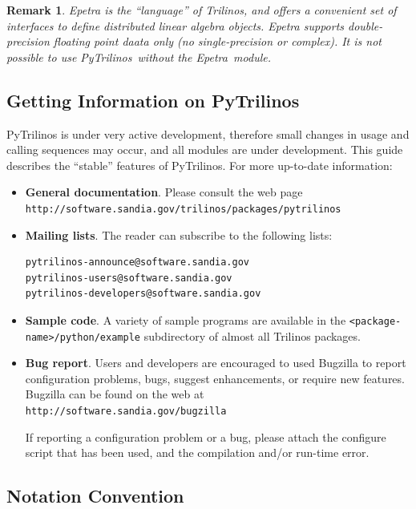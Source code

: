 \documentclass[10pt,relax]{SANDreport}
\newcommand{\PyTrilinos}{{PyTrilinos}}
\newcommand{\epetra}{{Epetra}}
\newtheorem{remark}{Remark}
\begin{document}
\begin{remark}
Epetra is the
``language'' of Trilinos, and offers a convenient set of interfaces to define
distributed linear algebra objects. Epetra supports double-precision floating
point daata only (no single-precision or complex). 
It is not possible to use \PyTrilinos\ without the \epetra\ module.
\end{remark}

\subsection{Getting Information on \PyTrilinos}

PyTrilinos is under very active development, therefore small changes in usage
and calling sequences may occur, and all modules are under development. This
guide describes the ``stable'' features of PyTrilinos. For more up-to-date
information:
\begin{itemize}
\item {\bf General documentation}.
Please consult the web page \\
  \verb!http://software.sandia.gov/trilinos/packages/pytrilinos!
\item {\bf Mailing lists}. The reader can subscribe to the following lists:
\begin{verbatim}
pytrilinos-announce@software.sandia.gov
pytrilinos-users@software.sandia.gov
pytrilinos-developers@software.sandia.gov
\end{verbatim}
\item {\bf Sample code}. A variety of sample programs are available in the
\verb!<package-name>/python/example! subdirectory of almost all Trilinos
packages.
\item {\bf Bug report}.
Users and developers are encouraged to used Bugzilla to report
configuration problems, bugs, suggest enhancements, or require new features.
Bugzilla can be found on the web at\\
  \verb!http://software.sandia.gov/bugzilla!

If reporting a configuration problem or a bug, please attach the configure
script that has been used, and the compilation and/or run-time error.
\end{itemize}

\subsection{Notation Convention}
\end{document}
